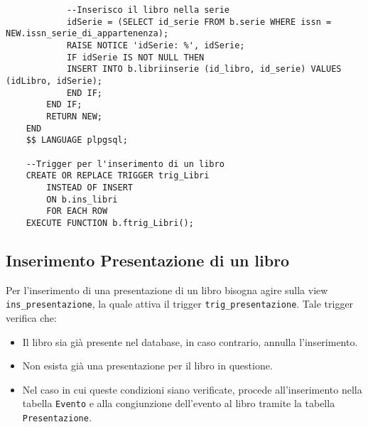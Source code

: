 \begin{lstlisting}
            --Inserisco il libro nella serie
            idSerie = (SELECT id_serie FROM b.serie WHERE issn = NEW.issn_serie_di_appartenenza);
            RAISE NOTICE 'idSerie: %', idSerie;
            IF idSerie IS NOT NULL THEN
            INSERT INTO b.libriinserie (id_libro, id_serie) VALUES (idLibro, idSerie);
            END IF;
        END IF;
        RETURN NEW;
    END
    $$ LANGUAGE plpgsql;
    
    --Trigger per l'inserimento di un libro
    CREATE OR REPLACE TRIGGER trig_Libri
        INSTEAD OF INSERT
        ON b.ins_libri
        FOR EACH ROW
    EXECUTE FUNCTION b.ftrig_Libri();
\end{lstlisting}

\subsection{Inserimento Presentazione di un libro}
Per l'inserimento di una presentazione di un libro bisogna agire sulla view \texttt{ins\_presentazione},
la quale attiva il trigger \texttt{trig\_presentazione}.
Tale trigger verifica che:
\begin{itemize}
    \item Il libro sia gi\`a presente nel database, in caso contrario, annulla l'inserimento.
    \item Non esista gi\`a una presentazione per il libro in questione.
    \item Nel caso in cui queste condizioni siano verificate, procede all'inserimento nella tabella
          \texttt{Evento} e alla congiunzione dell'evento al libro tramite la tabella \texttt{Presentazione}.
\end{itemize}
